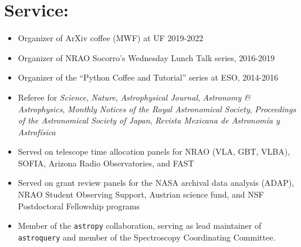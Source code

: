 
\begin{minipage}{\textwidth}
\setlength{\extrarowheight}{4pt}
\section*{Service:}
\vspace{-10pt}
\begin{itemize}
\itemsep-3pt
        
    \item Organizer of ArXiv coffee (MWF) at UF 2019-2022
    \item Organizer of NRAO Socorro's Wednesday Lunch Talk series, 2016-2019
    \item Organizer of the ``Python Coffee and Tutorial'' series at ESO, 2014-2016
    \item Referee for 
            \textit{Science},
            \textit{Nature},
            \textit{Astrophysical Journal},
            \textit{Astronomy \& Astrophysics},
            \textit{Monthly Notices of the Royal Astronomical Society},
            \textit{Proceedings of the Astronomical Society of Japan},
            \textit{Revista Mexicana de Astronom{\'i}a y Astrof{\'i}sica}
    \item Served on telescope time allocation panels for NRAO (VLA, GBT, VLBA), SOFIA,
        Arizona Radio Observatories, and FAST
    \item Served on grant review panels for the NASA archival data analysis (ADAP), 
        NRAO Student Observing Support,
        Austrian science fund,
        and NSF Postdoctoral Fellowship programs
    \item Member of the \texttt{astropy} collaboration, serving as lead maintainer
        of \texttt{astroquery} and member of the Spectroscopy Coordinating Committee.
\end{itemize}


\end{minipage}
